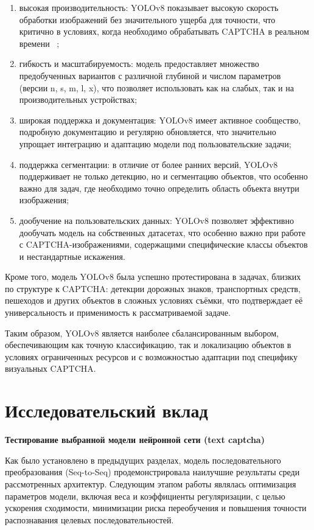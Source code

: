 \begin{enumerate}
    \item высокая производительность: YOLOv8 показывает высокую скорость 
    обработки изображений без значительного ущерба для точности, что критично в 
    условиях, когда необходимо обрабатывать CAPTCHA в реальном времени~
    \cite{bochkovskiy2020yolov4};
    \item гибкость и масштабируемость: модель предоставляет множество 
    предобученных вариантов с различной глубиной и числом параметров (версии n, 
    s, m, l, x), что позволяет использовать как на слабых, так и на 
    производительных устройствах;
    \item широкая поддержка и документация: YOLOv8 имеет активное сообщество, 
    подробную документацию и регулярно обновляется, что значительно упрощает 
    интеграцию и адаптацию модели под пользовательские задачи;
    \item поддержка сегментации: в отличие от более ранних версий, YOLOv8 
    поддерживает не только детекцию, но и сегментацию объектов, что особенно 
    важно для задач, где необходимо точно определить область объекта внутри 
    изображения;
    \item дообучение на пользовательских данных: YOLOv8 позволяет эффективно 
    дообучать модель на собственных датасетах, что особенно важно при работе с 
    CAPTCHA-изображениями, содержащими специфические классы объектов и 
    нестандартные искажения.
\end{enumerate}

Кроме того, модель YOLOv8 была успешно протестирована в задачах, близких по 
структуре к CAPTCHA: детекции дорожных знаков, транспортных средств, пешеходов и 
других объектов в сложных условиях съёмки, что подтверждает её универсальность и 
применимость к рассматриваемой задаче.

Таким образом, YOLOv8 является наиболее сбалансированным выбором, обеспечивающим 
как точную классификацию, так и локализацию объектов в условиях ограниченных 
ресурсов и с возможностью адаптации под специфику визуальных CAPTCHA.

\section{Исследовательский вклад}

\textbf{Тестирование выбранной модели нейронной сети (text captcha)}

Как было установлено в предыдущих разделах, модель последовательного 
преобразования (Seq-to-Seq) продемонстрировала наилучшие результаты среди 
рассмотренных архитектур. Следующим этапом работы являлась оптимизация параметров 
модели, включая веса и коэффициенты регуляризации, с целью ускорения сходимости, 
минимизации риска переобучения и повышения точности распознавания целевых 
последовательностей.

